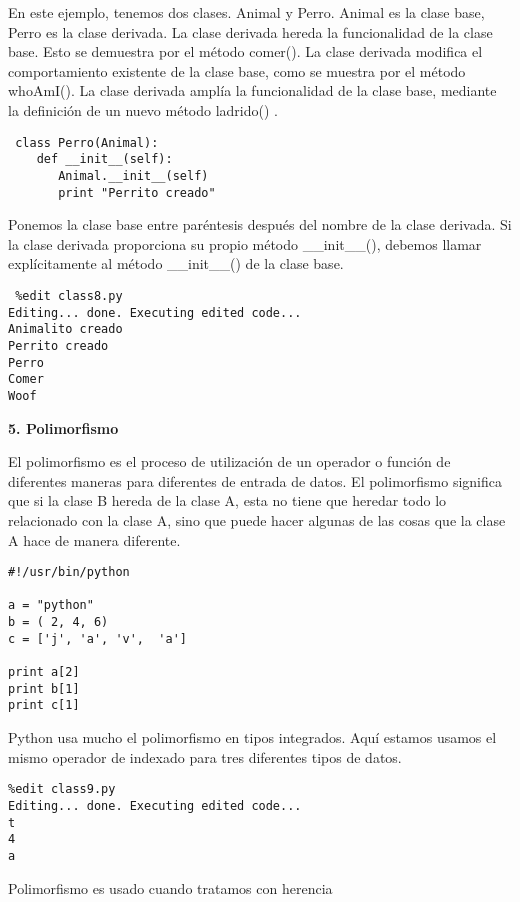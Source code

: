 \documentclass[twoside,10.5pt]{article}%
\begin{document}
En este ejemplo, tenemos dos clases. Animal y Perro. Animal es la clase base, Perro es la clase derivada. La clase derivada hereda la funcionalidad de la clase base. Esto se  demuestra por el m\'etodo comer(). La clase derivada modifica el comportamiento existente de la clase base, como se muestra por el m\'etodo whoAmI(). La clase derivada ampl\'ia la funcionalidad de la clase base, mediante la definici\'on de un nuevo m\'etodo ladrido() .

\begin{verbatim}
 class Perro(Animal):
    def __init__(self):
       Animal.__init__(self)
       print "Perrito creado"
\end{verbatim}

Ponemos la clase base  entre par\'entesis despu\'es del nombre de la clase derivada. Si la clase derivada proporciona su propio m\'etodo {\color{blue}\_\_init\_\_()}, debemos llamar expl\'icitamente al m\'etodo  {\color{blue}\_\_init\_\_()} de la clase base.

\begin{verbatim}
 %edit class8.py
Editing... done. Executing edited code...
Animalito creado
Perrito creado
Perro
Comer
Woof
\end{verbatim}


\textbf{5. Polimorfismo}

El polimorfismo es el proceso de utilizaci\'on de un operador o funci\'on de diferentes maneras para diferentes de entrada de datos. El polimorfismo significa que si la clase B hereda de la clase A, esta no tiene que heredar todo lo relacionado con la clase A, sino que puede hacer algunas de las cosas que la clase A hace de manera diferente.

\begin{verbatim}
#!/usr/bin/python

a = "python"
b = ( 2, 4, 6)
c = ['j', 'a', 'v',  'a']

print a[2]
print b[1]
print c[1]
\end{verbatim}


Python usa mucho el polimorfismo en tipos integrados. Aqu\'i estamos usamos el mismo operador de indexado para tres diferentes tipos de datos.

\begin{verbatim}
%edit class9.py
Editing... done. Executing edited code...
t
4
a
\end{verbatim}

Polimorfismo es usado cuando tratamos con herencia
\end{document}
